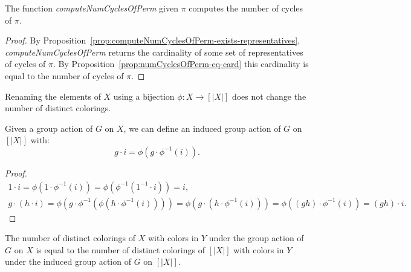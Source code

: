 \begin{proposition}
  \label{prop:computeNumCyclesOfPerm-eq-numCyclesOfPerm}
  \leanok
  The function \emph{computeNumCyclesOfPerm} given $\pi$ computes the number of cycles of $\pi$.
\end{proposition}

\begin{proof}
  \leanok
  By Proposition~\ref{prop:computeNumCyclesOfPerm-exists-representatives}, \emph{computeNumCyclesOfPerm} returns the cardinality of some set of representatives of cycles of $\pi$. By Proposition~\ref{prop:numCyclesOfPerm-eq-card} this cardinality is equal to the number of cycles of $\pi$.
\end{proof}

Renaming the elements of $X$ using a bijection $\phi : X \to [|X|]$ does not change the number of distinct colorings.

\begin{proposition}
  \label{prop:MulActionFin}
  \leanok
  Given a group action of $G$ on $X$, we can define an induced group action of $G$ on $[|X|]$ with:
  \begin{equation*}
    g \cdot i = \phi(g \cdot \phi^{-1}(i)).
  \end{equation*}
\end{proposition}

\begin{proof}
  \leanok
  \begin{gather*}
    1 \cdot i = \phi(1 \cdot \phi^{-1}(i)) = \phi(\phi^{-1}(1^{-1} \cdot i)) = i, \\
    g \cdot (h \cdot i) = \phi(g \cdot \phi^{-1}(\phi(h \cdot \phi^{-1}(i)))) = \phi(g \cdot (h \cdot \phi^{-1}(i))) = \phi((gh) \cdot \phi^{-1}(i)) = (gh) \cdot i.
  \end{gather*}
\end{proof}

\begin{proposition}
  \label{prop:numDistinctColorings-eq-numDistinctColorings-of-Fin}
  \leanok
  The number of distinct colorings of $X$ with colors in $Y$ under the group action of $G$ on $X$ is equal to the number of distinct colorings of $[|X|]$ with colors in $Y$ under the induced group action of $G$ on $[|X|]$.
\end{proposition}

